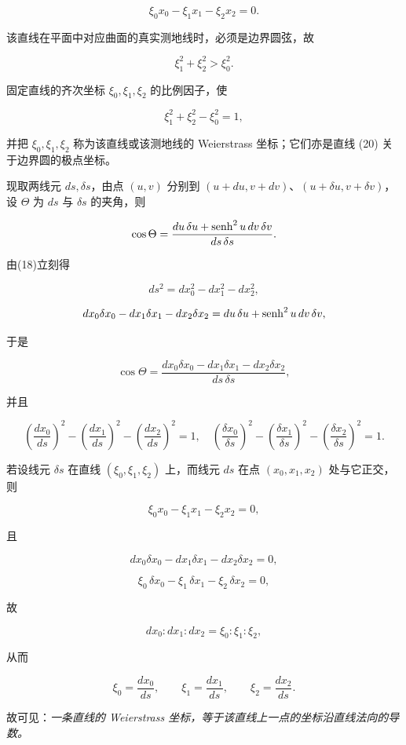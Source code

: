 \[
\tag{20}
 \xi_0x_0-\xi_1x_1-\xi_2x_2=0.
\]

该直线在平面中对应曲面的真实测地线时，必须是边界圆弦，故

\[
 \xi_1^2+\xi_2^2>\xi_0^2.
\]

固定直线的齐次坐标 \(\xi_0,\xi_1,\xi_2\) 的比例因子，使

\[
\tag{20*}
 \xi_1^2+\xi_2^2-\xi_0^2=1,
\]

并把 $\xi_0,\xi_1,\xi_2$ 称为该直线或该测地线的 Weierstrass 坐标；它们亦是直线 (20) 关于边界圆的极点坐标。



现取两线元 $ds,\delta s$，由点 $(u,v)$ 分别到 $(u+du,v+dv)$、$(u+\delta u,v+\delta v)$，设 \(\Theta\) 为 \(ds\) 与 \(\delta s\) 的夹角，则

\[
 \cos\Theta=\frac{du\,\delta u+\operatorname{senh}^2u\,dv\,\delta v}{ds\,\delta s}.
\]

由(18)立刻得

\[
 ds^2=dx_0^2-dx_1^2-dx_2^2,
\]

\[
 dx_0\delta x_0-dx_1\delta x_1-dx_2\delta x_2=du\,\delta u+\operatorname{senh}^2u\,dv\,\delta v,
\]

于是

\[
 \cos\Theta=\frac{dx_0\delta x_0-dx_1\delta x_1-dx_2\delta x_2}{ds\,\delta s},
\]

并且

\[
 \left(\frac{dx_0}{ds}\right)^2-\left(\frac{dx_1}{ds}\right)^2-\left(\frac{dx_2}{ds}\right)^2=1,
\quad
 \left(\frac{\delta x_0}{\delta s}\right)^2-\left(\frac{\delta x_1}{\delta s}\right)^2-\left(\frac{\delta x_2}{\delta s}\right)^2=1.
\]

若设线元 \(\delta s\) 在直线 \((\xi_0,\xi_1,\xi_2)\) 上，而线元 \(ds\) 在点 \((x_0,x_1,x_2)\) 处与它正交，则

\[
 \xi_0x_0-\xi_1x_1-\xi_2x_2=0,
\]

且

\[
 dx_0\delta x_0-dx_1\delta x_1-dx_2\delta x_2=0,
\]

\[
 \xi_0\,\delta x_0-\xi_1\,\delta x_1-\xi_2\,\delta x_2=0,
\]

故

\[
 dx_0:dx_1:dx_2=\xi_0:\xi_1:\xi_2,
\]

从而

\[
 \xi_0=\frac{dx_0}{ds},\qquad \xi_1=\frac{dx_1}{ds},\qquad \xi_2=\frac{dx_2}{ds}.
\]

故可见：\emph{一条直线的 Weierstrass 坐标，等于该直线上一点的坐标沿直线法向的导数。}



